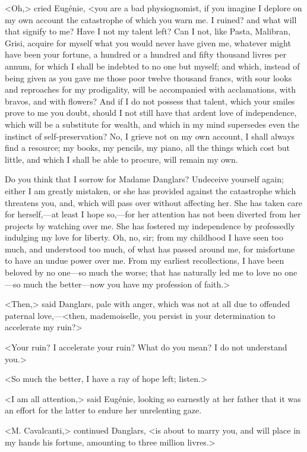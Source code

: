  <Oh,> cried Eugénie, <you are a bad physiognomist, if you imagine I deplore on my own account the catastrophe of which you warn me. I ruined? and what will that signify to me? Have I not my talent left? Can I not, like Pasta, Malibran, Grisi, acquire for myself what you would never have given me, whatever might have been your fortune, a hundred or a hundred and fifty thousand livres per annum, for which I shall be indebted to no one but myself; and which, instead of being given as you gave me those poor twelve thousand francs, with sour looks and reproaches for my prodigality, will be accompanied with acclamations, with bravos, and with flowers? And if I do not possess that talent, which your smiles prove to me you doubt, should I not still have that ardent love of independence, which will be a substitute for wealth, and which in my mind supersedes even the instinct of self-preservation? No, I grieve not on my own account, I shall always find a resource; my books, my pencils, my piano, all the things which cost but little, and which I shall be able to procure, will remain my own. 

 Do you think that I sorrow for Madame Danglars? Undeceive yourself again; either I am greatly mistaken, or she has provided against the catastrophe which threatens you, and, which will pass over without affecting her. She has taken care for herself,—at least I hope so,—for her attention has not been diverted from her projects by watching over me. She has fostered my independence by professedly indulging my love for liberty. Oh, no, sir; from my childhood I have seen too much, and understood too much, of what has passed around me, for misfortune to have an undue power over me. From my earliest recollections, I have been beloved by no one—so much the worse; that has naturally led me to love no one—so much the better—now you have my profession of faith.> 

 <Then,> said Danglars, pale with anger, which was not at all due to offended paternal love,—<then, mademoiselle, you persist in your determination to accelerate my ruin?> 

 <Your ruin? I accelerate your ruin? What do you mean? I do not understand you.> 

 <So much the better, I have a ray of hope left; listen.> 

 <I am all attention,> said Eugénie, looking so earnestly at her father that it was an effort for the latter to endure her unrelenting gaze. 

 <M. Cavalcanti,> continued Danglars, <is about to marry you, and will place in my hands his fortune, amounting to three million livres.> 

